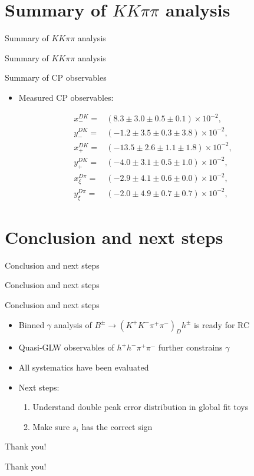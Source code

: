 \documentclass{beamer}
\begin{document}
\section{Summary of $KK\pi\pi$ analysis}
\begin{frame}{Summary of $KK\pi\pi$ analysis}
  \begin{center}
    {\huge Summary of $KK\pi\pi$ analysis}
  \end{center}
\end{frame}

\begin{frame}{Summary of CP observables}
  \begin{itemize}
    \item{Measured CP observables:}
  \end{itemize}
  \begin{align*}
    x_-^{DK} =& (8.3 \pm 3.0 \pm 0.5 \pm 0.1)\times 10^{-2}, \\
    y_-^{DK} =& (-1.2 \pm 3.5 \pm 0.3 \pm 3.8)\times 10^{-2}, \\
    x_+^{DK} =& (-13.5 \pm 2.6 \pm 1.1 \pm 1.8)\times 10^{-2}, \\
    y_+^{DK} =& (-4.0 \pm 3.1 \pm 0.5 \pm 1.0)\times 10^{-2}, \\
    x_\xi^{D\pi} =& (-2.9 \pm 4.1 \pm 0.6 \pm 0.0)\times 10^{-2}, \\
    y_\xi^{D\pi} =& (-2.0 \pm 4.9 \pm 0.7 \pm 0.7)\times 10^{-2},
  \end{align*}
\end{frame}

\section{Conclusion and next steps}
\begin{frame}{Conclusion and next steps}
  \begin{center}
    {\huge Conclusion and next steps}
  \end{center}
\end{frame}

\begin{frame}{Conclusion and next steps}
  \begin{itemize}
    \setlength\itemsep{2em}
    \item{Binned $\gamma$ analysis of $B^\pm\to(K^+K^-\pi^+\pi^-)_Dh^\pm$ is ready for RC}
    \item{Quasi-GLW observables of $h^+h^-\pi^+\pi^-$ further constrains $\gamma$}
    \item{All systematics have been evaluated}
    \item{Next steps:}
    \begin{enumerate}
      \item{Understand double peak error distribution in global fit toys}
      \item{Make sure $s_i$ has the correct sign}
    \end{enumerate}
  \end{itemize}
\end{frame}

\begin{frame}{Thank you!}
  \begin{center}
    {\huge Thank you!}
  \end{center}
\end{frame}
\end{document}
